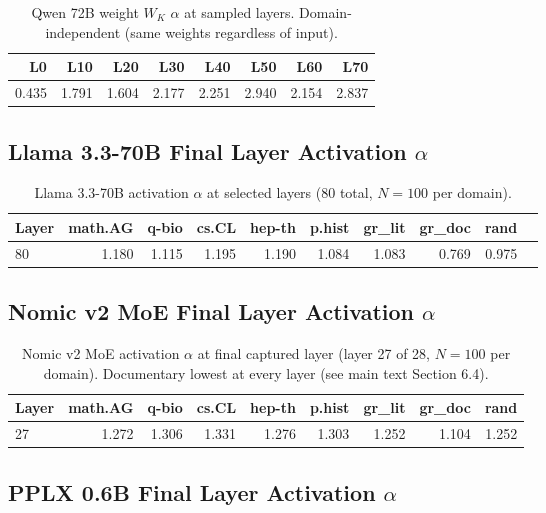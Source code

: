 \documentclass[11pt,letterpaper]{article}
\newcommand{\al}{\alpha}
\begin{document}
\begin{longtable}{rrrrrrrr}
\caption{Qwen 72B weight $W_K$ $\al$ at sampled layers.
Domain-independent (same weights regardless of input).} \\
\toprule
\textbf{L0} & \textbf{L10} & \textbf{L20} & \textbf{L30} &
\textbf{L40} & \textbf{L50} & \textbf{L60} & \textbf{L70} \\
\midrule
0.435 & 1.791 & 1.604 & 2.177 & 2.251 & 2.940 & 2.154 & 2.837 \\
\bottomrule
\end{longtable}

\subsection{Llama 3.3-70B Final Layer Activation $\al$}

\begin{longtable}{lrrrrrrrrr}
\caption{Llama 3.3-70B activation $\al$ at selected layers
(80 total, $N = 100$ per domain).} \\
\toprule
\textbf{Layer} & \textbf{math.AG} & \textbf{q-bio} & \textbf{cs.CL} &
\textbf{hep-th} & \textbf{p.hist} & \textbf{gr\_lit} &
\textbf{gr\_doc} & \textbf{rand} \\
\midrule
80 & 1.180 & 1.115 & 1.195 & 1.190 & 1.084 & 1.083 & 0.769 & 0.975 \\
\bottomrule
\end{longtable}

\subsection{Nomic v2 MoE Final Layer Activation $\al$}

\begin{longtable}{lrrrrrrrr}
\caption{Nomic v2 MoE activation $\al$ at final captured layer
(layer 27 of 28, $N = 100$ per domain).  Documentary lowest at
every layer (see main text Section 6.4).} \\
\toprule
\textbf{Layer} & \textbf{math.AG} & \textbf{q-bio} & \textbf{cs.CL} &
\textbf{hep-th} & \textbf{p.hist} & \textbf{gr\_lit} &
\textbf{gr\_doc} & \textbf{rand} \\
\midrule
27 & 1.272 & 1.306 & 1.331 & 1.276 & 1.303 & 1.252 & 1.104 & 1.252 \\
\bottomrule
\end{longtable}

\subsection{PPLX 0.6B Final Layer Activation $\al$}
\end{document}
